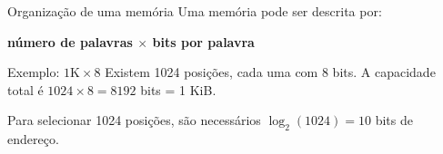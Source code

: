 \begin{frame}[t]{Organização de uma memória}
  Uma memória pode ser descrita por:
  \begin{center}
    \large \textbf{número de palavras $\times$ bits por palavra}
  \end{center}
  \begin{exampleblock}{Exemplo: $1\text{K} \times 8$}
    Existem 1024 posições, cada uma com 8 bits. A capacidade total é $1024 \times 8 = 8192$ bits = 1 KiB.
  \end{exampleblock}
  Para selecionar 1024 posições, são necessários $\log_2(1024)=10$ bits de endereço.
\end{frame}
